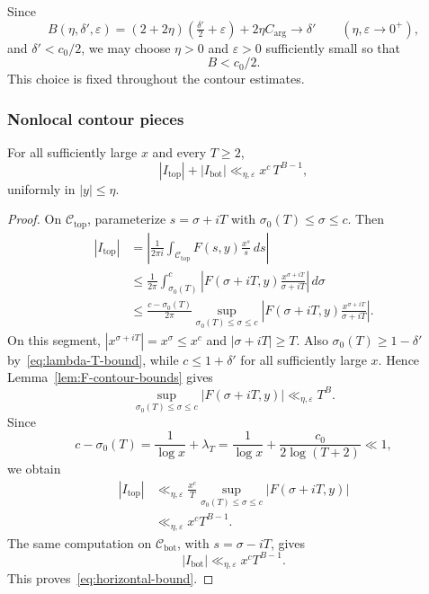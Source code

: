 Since
\[
    B(\eta,\delta',\varepsilon)
    =(2+2\eta)\left(\tfrac{\delta'}{2}+\varepsilon\right)
      +2\eta C_{\arg}
    \longrightarrow \delta'
    \qquad (\eta,\varepsilon\to0^+),
\]
and $\delta'<c_0/2$, we may choose $\eta>0$ and
$\varepsilon>0$ sufficiently small so that
\begin{equation}\label{eq:B-small}
    B<c_0/2.
\end{equation}
This choice is fixed throughout the contour estimates.

\subsubsection*{Nonlocal contour pieces}

\begin{lemma}
\label{lem:horizontal-contour-bound}
For all sufficiently large $x$ and every $T \geq 2$,
\begin{equation}\label{eq:horizontal-bound}
    |I_{\mathrm{top}}| + |I_{\mathrm{bot}}|
    \ll_{\eta, \varepsilon}
    x^c \, T^{B - 1},
\end{equation}
uniformly in $|y| \leq \eta$.
\end{lemma}

\begin{proof}
On $\mathcal{C}_{\mathrm{top}}$, parameterize $s = \sigma + iT$
with $\sigma_0(T) \leq \sigma \leq c$. Then
\[
\begin{aligned}
    |I_{\mathrm{top}}|
    &= \left| \frac{1}{2\pi i}
       \int_{\mathcal{C}_{\mathrm{top}}}
       F(s,y)\frac{x^s}{s}\,ds \right|  \\
    &\leq \frac{1}{2\pi}
       \int_{\sigma_0(T)}^c
       \left|F(\sigma+iT,y)\frac{x^{\sigma+iT}}{\sigma+iT}\right|
       \,d\sigma                                      \\
    &\leq \frac{c-\sigma_0(T)}{2\pi}
       \sup_{\sigma_0(T)\leq\sigma\leq c}
       \left|F(\sigma+iT,y)\frac{x^{\sigma+iT}}{\sigma+iT}\right|.
\end{aligned}
\]
On this segment, $|x^{\sigma+iT}|=x^\sigma\leq x^c$ and
$|\sigma+iT|\geq T$. Also
$\sigma_0(T)\geq1-\delta'$ by~\eqref{eq:lambda-T-bound}, while
$c\leq1+\delta'$ for all sufficiently large $x$. Hence
Lemma~\ref{lem:F-contour-bounds} gives
\[
    \sup_{\sigma_0(T)\leq\sigma\leq c}|F(\sigma+iT,y)|
    \ll_{\eta,\varepsilon}T^B.
\]
Since
\[
    c-\sigma_0(T)
    =\frac{1}{\log x}+\lambda_T
    =\frac{1}{\log x}+\frac{c_0}{2\log(T+2)}
    \ll 1,
\]
we obtain
\[
\begin{aligned}
    |I_{\mathrm{top}}|
    &\ll_{\eta,\varepsilon}
       \frac{x^c}{T}
       \sup_{\sigma_0(T)\leq\sigma\leq c}|F(\sigma+iT,y)|  \\
    &\ll_{\eta,\varepsilon} x^c T^{B-1}.
\end{aligned}
\]
The same computation on $\mathcal{C}_{\mathrm{bot}}$, with
$s=\sigma-iT$, gives
\[
    |I_{\mathrm{bot}}|\ll_{\eta,\varepsilon}x^cT^{B-1}.
\]
This proves~\eqref{eq:horizontal-bound}.
\end{proof}

